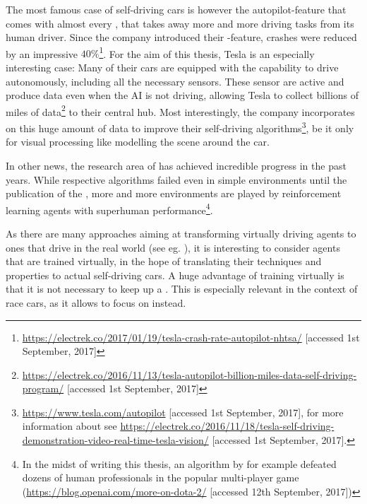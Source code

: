 The most famous case of self-driving cars is however the autopilot-feature that comes with almost every , that takes away more and more driving tasks from its human driver. Since the company introduced their -feature, crashes were reduced by an impressive $40\%$\footnote{\url{https://electrek.co/2017/01/19/tesla-crash-rate-autopilot-nhtsa/}  [accessed 1st September, 2017]}. For the aim of this thesis, Tesla is an especially interesting case: Many of their cars are equipped with the capability to drive autonomously, including all the necessary sensors. These sensor are active and produce data even when the AI is not driving, allowing Tesla to collect billions of miles of data\footnote{\url{https://electrek.co/2016/11/13/tesla-autopilot-billion-miles-data-self-driving-program/} [accessed 1st September, 2017]} to their central hub. Most interestingly, the company incorporates  on this huge amount of data to improve their self-driving algorithms\footnote{\url{https://www.tesla.com/autopilot} [accessed 1st September, 2017], for more information about  see  \url{https://electrek.co/2016/11/18/tesla-self-driving-demonstration-video-real-time-tesla-vision/} [accessed 1st September, 2017].}, be it only for visual processing like modelling the scene around the car.

In other news, the research area of  has achieved incredible progress in the past years. While respective algorithms failed even in simple environments until the publication of the \cite{mnih_playing_2013}, more and more environments are played by reinforcement learning agents with superhuman performance\footnote{In the midst of writing this thesis, an algorithm by  for example defeated dozens of human professionals in the popular multi-player game  (\url{https://blog.openai.com/more-on-dota-2/} [accessed 12th September, 2017])}. 

As there are many approaches aiming at transforming virtually driving agents to ones that drive in the real world (see eg. \cite{you_virtual_2017}), it is interesting to consider agents that are trained virtually, in the hope of translating their techniques and properties to actual self-driving cars. A huge advantage of training virtually is that it is not necessary to keep up a . This is especially relevant in the context of race cars, as it allows to focus on  instead.

